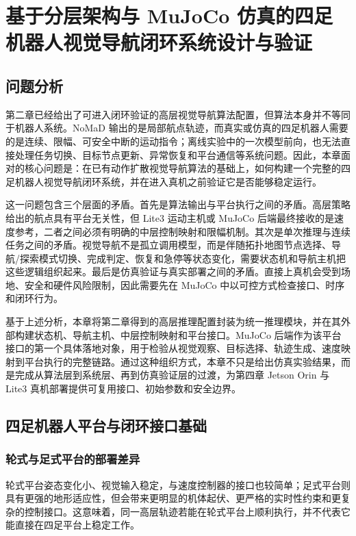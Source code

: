 ﻿%

\chapter{基于分层架构与 MuJoCo 仿真的四足机器人视觉导航闭环系统设计与验证}

\section{问题分析}

第二章已经给出了可进入闭环验证的高层视觉导航算法配置，但算法本身并不等同于机器人系统。NoMaD 输出的是局部航点轨迹，而真实或仿真的四足机器人需要的是连续、限幅、可安全中断的运动指令；离线实验中的一次模型前向，也无法直接处理任务切换、目标节点更新、异常恢复和平台通信等系统问题。因此，本章面对的核心问题是：在已有动作扩散视觉导航算法的基础上，如何构建一个完整的四足机器人视觉导航闭环系统，并在进入真机之前验证它是否能够稳定运行。

这一问题包含三个层面的矛盾。首先是算法输出与平台执行之间的矛盾。高层策略给出的航点具有平台无关性，但 Lite3 运动主机或 MuJoCo 后端最终接收的是速度参考，二者之间必须有明确的中层控制映射和限幅机制。其次是单次推理与连续任务之间的矛盾。视觉导航不是孤立调用模型，而是伴随拓扑地图节点选择、导航/探索模式切换、完成判定、恢复和急停等状态变化，需要状态机和导航主机把这些逻辑组织起来。最后是仿真验证与真实部署之间的矛盾。直接上真机会受到场地、安全和硬件风险限制，因此需要先在 MuJoCo 中以可控方式检查接口、时序和闭环行为。

基于上述分析，本章将第二章得到的高层推理配置封装为统一推理模块，并在其外部构建状态机、导航主机、中层控制映射和平台接口。MuJoCo 后端作为该平台接口的第一个具体落地对象，用于检验从视觉观察、目标选择、轨迹生成、速度映射到平台执行的完整链路。通过这种组织方式，本章不只是给出仿真实验结果，而是完成从算法层到系统层、再到仿真验证层的过渡，为第四章 Jetson Orin 与 Lite3 真机部署提供可复用接口、初始参数和安全边界。

\section{四足机器人平台与闭环接口基础}

\subsection{轮式与足式平台的部署差异}

轮式平台姿态变化小、视觉输入稳定，与速度控制器的接口也较简单；足式平台则具有更强的地形适应性，但会带来更明显的机体起伏、更严格的实时性约束和更复杂的控制接口\cite{hwangbo2019anymal,lee2020learning}。这意味着，同一高层轨迹若能在轮式平台上顺利执行，并不代表它能直接在四足平台上稳定工作。

